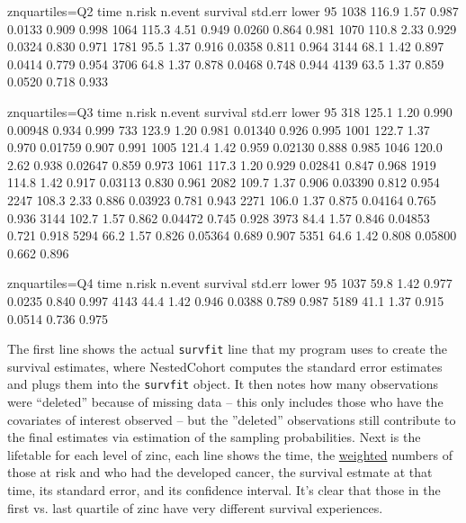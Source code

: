 \documentclass[10pt]{article}
\begin{document}
\begin{Schunk}
\begin{Soutput}
                znquartiles=Q2 
 time n.risk n.event survival std.err lower 95%
 1038  116.9    1.57    0.987  0.0133        0.909        0.998
 1064  115.3    4.51    0.949  0.0260        0.864        0.981
 1070  110.8    2.33    0.929  0.0324        0.830        0.971
 1781   95.5    1.37    0.916  0.0358        0.811        0.964
 3144   68.1    1.42    0.897  0.0414        0.779        0.954
 3706   64.8    1.37    0.878  0.0468        0.748        0.944
 4139   63.5    1.37    0.859  0.0520        0.718        0.933

                znquartiles=Q3 
 time n.risk n.event survival std.err lower 95%
  318  125.1    1.20    0.990 0.00948        0.934        0.999
  733  123.9    1.20    0.981 0.01340        0.926        0.995
 1001  122.7    1.37    0.970 0.01759        0.907        0.991
 1005  121.4    1.42    0.959 0.02130        0.888        0.985
 1046  120.0    2.62    0.938 0.02647        0.859        0.973
 1061  117.3    1.20    0.929 0.02841        0.847        0.968
 1919  114.8    1.42    0.917 0.03113        0.830        0.961
 2082  109.7    1.37    0.906 0.03390        0.812        0.954
 2247  108.3    2.33    0.886 0.03923        0.781        0.943
 2271  106.0    1.37    0.875 0.04164        0.765        0.936
 3144  102.7    1.57    0.862 0.04472        0.745        0.928
 3973   84.4    1.57    0.846 0.04853        0.721        0.918
 5294   66.2    1.57    0.826 0.05364        0.689        0.907
 5351   64.6    1.42    0.808 0.05800        0.662        0.896

                znquartiles=Q4 
 time n.risk n.event survival std.err lower 95%
 1037   59.8    1.42    0.977  0.0235        0.840        0.997
 4143   44.4    1.42    0.946  0.0388        0.789        0.987
 5189   41.1    1.37    0.915  0.0514        0.736        0.975
\end{Soutput}
\end{Schunk}

The first line shows the actual \texttt{survfit} line that my program uses to create the
survival estimates, where NestedCohort computes the standard error estimates and plugs
them into the \texttt{survfit} object.  It then notes how many observations were
``deleted'' because of missing data -- this only includes those who have the covariates of
interest observed -- but the ''deleted'' observations still contribute to the final
estimates via estimation of the sampling probabilities.  Next is the lifetable for each
level of zinc, each line shows the time, the \underline{weighted} numbers of those at risk
and who had the developed cancer, the survival estmate at that time, its standard error,
and its confidence interval.  It's clear that those in the first vs. last quartile of zinc
have very different survival experiences.
\end{document}
